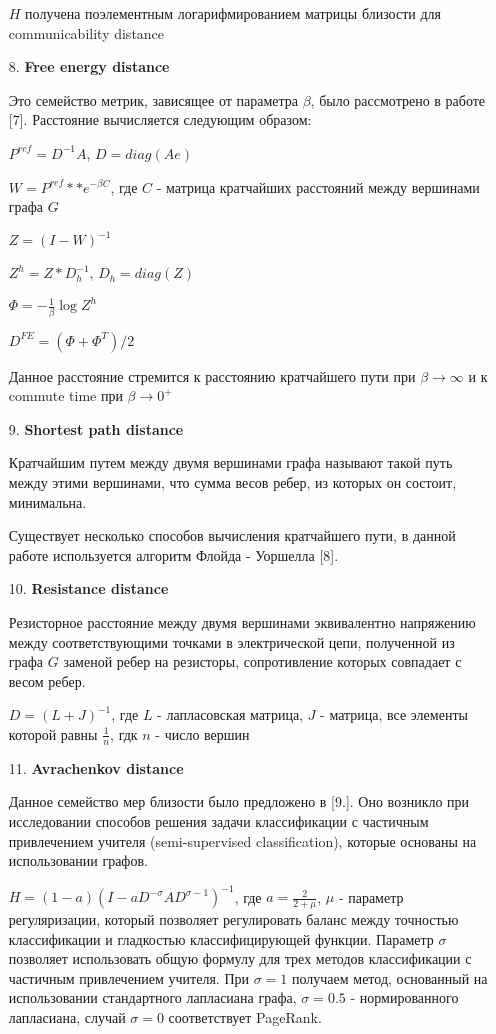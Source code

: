 \begin{itemize}
$H$ получена поэлементным логарифмированием матрицы близости для communicability distance

\item[8.] \textbf{Free energy distance}

Это семейство метрик, зависящее от параметра $\beta$, было рассмотрено в работе [7]. Расстояние вычисляется следующим образом:

$P^{ref} = D^{-1} A$, $D = diag(Ae)$

$W = P^{ref} ** e^{-\beta C}$, где $C$ - матрица кратчайших расстояний между вершинами графа $G$

$Z = (I-W)^{-1}$

$Z^h = Z * D_h^{-1}$, $D_h = diag(Z)$

$\Phi = -\frac{1}{\beta} \log Z^h$

$D^{FE} = (\Phi + \Phi ^T)/ 2$

Данное расстояние стремится к расстоянию кратчайшего пути при $\beta \rightarrow \infty$ и к commute time при $\beta \rightarrow 0^+$

\item[9.] \textbf{Shortest path distance}

Кратчайшим путем между двумя вершинами графа называют такой путь между этими вершинами, что сумма весов ребер, из которых он состоит, минимальна.

Существует несколько способов вычисления кратчайшего пути, в данной работе используется алгоритм Флойда - Уоршелла [8].

\item[10.] \textbf{Resistance distance}

Резисторное расстояние между двумя вершинами эквивалентно напряжению между соответствующими точками в электрической цепи, полученной из графа $G$ заменой ребер на резисторы, сопротивление которых совпадает с весом ребер. 

$D = (L + J)^{-1}$, где $L$ - лапласовская матрица, $J$ - матрица, все элементы которой равны $\frac {1}{n}$, гдк $n$ - число вершин

\item[11.] \textbf{Avrachenkov distance}

Данное семейство мер близости было предложено в [9.]. Оно возникло при исследовании способов решения задачи классификации с частичным привлечением учителя (semi-supervised classification), которые основаны на использовании графов. 

$H = (1 - a)(I - aD^{-\sigma}AD^{\sigma-1})^{-1}$, где $a = \frac {2}{2+\mu}$,  $\mu$ - параметр регуляризации, который позволяет регулировать баланс между точностью классификации и гладкостью классифицирующей функции. Параметр 
$\sigma$ позволяет использовать общую формулу для трех методов классификации с частичным привлечением учителя. При $\sigma = 1$ получаем метод, основанный на использовании стандартного лапласиана графа, $\sigma = 0.5$ - нормированного лапласиана,  случай $\sigma = 0$ соответствует PageRank.


\end{itemize}
